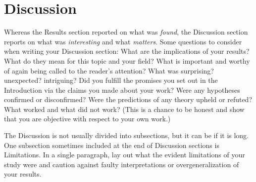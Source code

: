 \section{Discussion}
Whereas the Results section reported on what was \emph{found}, the Discussion section reports on what was \emph{interesting} and what \emph{matters}. 
Some questions to consider when writing your Discussion section: 
What are the implications of your results?
What do they mean for this topic and your field?
What is important and worthy of again being called to the reader’s attention? 
What was surprising? unexpected? intriguing? 
Did you fulfill the promises you set out in the Introduction via the claims you made about your work? 
Were any hypotheses confirmed or disconfirmed? 
Were the predictions of any theory upheld or refuted? 
What worked and what did not work? 
(This is a chance to be honest and show that you are objective with respect to your own work.)

The Discussion is not usually divided into subsections, but it can be if it is long. 
One subsection sometimes included at the end of Discussion sections is Limitations. 
In a single paragraph, lay out what the evident limitations of your study were and caution against faulty interpretations or overgeneralization of your results.